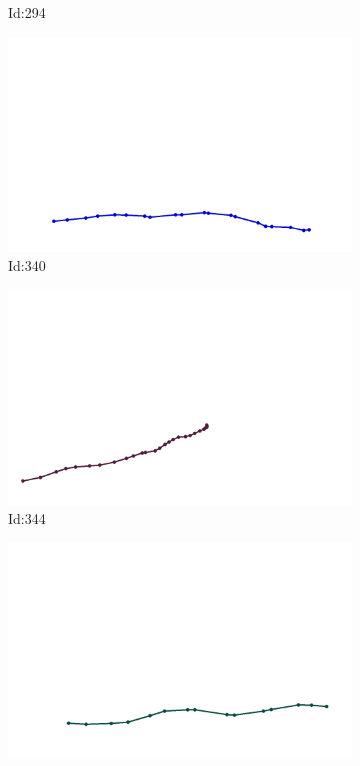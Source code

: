 \documentclass[12pt,twoside]{report}
\begin{document}
\begin{figure}
\begin{subfigure}[b]{0.20\textwidth}
\caption{Id:294}
\end{subfigure}
\begin{subfigure}[b]{0.20\textwidth}
\centering
\includegraphics[width=\textwidth]{../trajectories/340.png}
\caption{Id:340}
\end{subfigure}
\begin{subfigure}[b]{0.20\textwidth}
\centering
\includegraphics[width=\textwidth]{../trajectories/344.png}
\caption{Id:344}
\end{subfigure}
\begin{subfigure}[b]{0.20\textwidth}
\centering
\includegraphics[width=\textwidth]{../trajectories/381.png}

\end{subfigure}
\end{figure}
\end{document}
